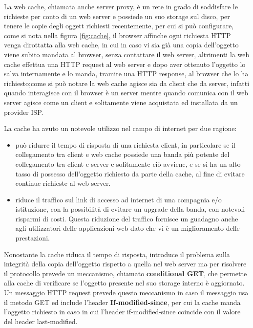 \documentclass[a4paper,12pt, oneside]{book}
\begin{document}
La web cache, chiamata anche server proxy, è un rete in grado di soddisfare le richieste per conto di un
web server e possiede un suo storage sul disco, per tenere le copie degli oggett richiesti recentemente,
per cui si può configurare, come si nota nella figura \ref{fig:cache}, il browser affinche ogni richiesta 
HTTP venga dirottatta alla web cache, in cui in caso vi sia già una copia dell'oggetto viene subito 
mandata al browser, senza contattare il web server, altrimenti la web cache effettua una HTTP request
al web server e dopo aver ottenuto l'oggetto lo salva internamente e lo manda, tramite una HTTP response,
al browser che lo ha richiesto;come si può notare la web cache agisce sia da client che da server, infatti
quando interagisce con il browser è un server mentre quando comunica con il web server agisce come un client
e solitamente viene acquistata ed installata da un provider ISP.

La cache ha avuto un notevole utilizzo nel campo di internet per due ragione:
\begin{itemize}
    \item può ridurre il tempo di risposta di una richiesta client, in particolare se il collegamento
        tra client e web cache possiede una banda più potente del collegamento tra client e server
        e solitamente ciò avviene, e se si ha un alto tasso di possesso dell'oggetto richiesto da parte
        della cache, al fine di evitare continue richieste al web server.

    \item riduce il traffico sul link di accesso ad internet di una compagnia e/o istituzione, con la
        possibilità di evitare un upgrade della banda, con notevoli risparmi di costi.\newline
        Questa riduzione del traffico fornisce un guadagno anche agli utilizzatori delle applicazioni web
        dato che vi è un miglioramento delle prestazioni.
\end{itemize}
Nonostante la cache riduca il tempo di risposta, introduce il problema sulla integrità della copia
dell'oggetto rispetto a quella nel web server ma per risolvere il protocollo prevede un meccanismo, 
chiamato \textbf{conditional GET}, che permette alla cache di verificare se l'oggetto presente nel
suo storage interno è aggiornato.\newline
Un messaggio HTTP request prevede questo meccanismo in caso il messaggio usa il metodo GET ed 
include l'header \textbf{If-modified-since}, per cui la cache manda l'oggetto richiesto in caso 
in cui l'header if-modified-since coincide con il valore del header last-modified.
\end{document}
